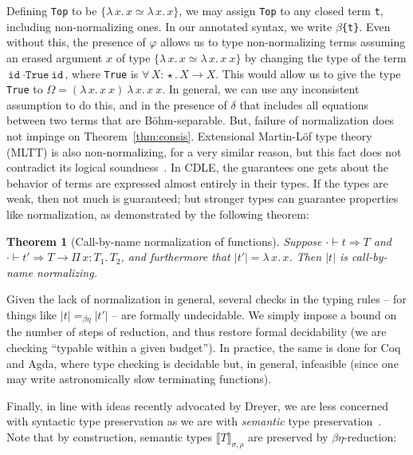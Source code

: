 \documentclass{article}
\newcommand{\abs}[4]{{#1}\, #2\! : \! #3.\, #4}
\newcommand{\absu}[3]{{#1}\, #2.\, #3}
\newcommand{\interp}[1]{\llbracket #1 \rrbracket}
\newcommand{\tpsynth}[0]{\Rightarrow}
\newtheorem{theorem}{Theorem}
\begin{document}
Defining \verb|Top| to be $\{\absu{\lambda}{x}{x} \simeq
\absu{\lambda}{x}{x}\}$, we may assign \verb|Top| to any closed term \verb|t|,
including non-normalizing ones. In our annotated syntax, we write
\texttt{\(\beta\)\{t\}}.
Even without this, the presence of \(\varphi\) allows us to type non-normalizing
terms assuming an erased argument \(x\) of type \(\{\absu{\lambda}{x}{x} \simeq
\absu{\lambda}{x}{x\ x}\}\) by changing the type of the term \(\texttt{id}\
\cdot \texttt{True}\ \texttt{id}\), where \texttt{True} is
\(\abs{\forall}{X}{\star}{X \to X}\).
This would allow us to give the type \texttt{True} to \(\Omega = (\absu{\lambda}{x}{x\ x})\
\absu{\lambda}{x}{x\ x}\).
In general, we can use any inconsistent assumption to do this, and in the
presence of \(\delta\) that includes all equations between two terms that are
B\"ohm-separable.
But, failure of normalization does not
impinge on Theorem~\ref{thm:consis}. Extensional Martin-L\"of type theory (MLTT)
is also non-normalizing, for a very similar reason, but this fact does not contradict
its logical soundness~\cite{dybjer16}. In CDLE, the guarantees one gets about
the behavior of terms are expressed almost entirely in their types. If the types
are weak, then not much is guaranteed; but stronger types can guarantee
properties like normalization, as demonstrated by the following theorem:

\begin{theorem}[Call-by-name normalization of functions]
  \label{thm:cedille-termination}
  Suppose \(\cdot \vdash t \tpsynth T\) and \(\cdot \vdash t' \tpsynth T \to
  \abs{\Pi}{x}{T_1}{T_2}\), and furthermore that \(|t'| =
  \absu{\lambda}{x}{x}\).
  Then \(|t|\) is call-by-name normalizing.
\end{theorem}

Given the lack of normalization in general, several checks in the typing rules --
for things like $|t| =_{\beta\eta} |t'|$ -- are formally undecidable.
We simply impose a bound on the number of steps of reduction,
and thus restore formal decidability (we are checking ``typable within
a given budget'').  In practice, the same is done for Coq and Agda,
where type checking is decidable but, in general, infeasible (since one
may write astronomically slow terminating functions).

Finally, in line with ideas recently advocated by Dreyer, we
are less concerned with syntactic
type preservation as we are with \emph{semantic} type
preservation~\cite{dreyer18}.
Note that by construction, semantic types $\interp{T}_{\sigma,\rho}$ are
preserved by $\beta\eta$-reduction:
\end{document}
